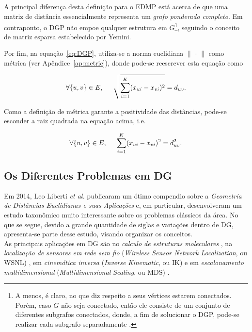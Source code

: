 \documentclass[a4paper,12pt]{article}
\begin{document}
A principal diferença desta definição para o EDMP está acerca de que uma matriz de distância essencialmente representa um \textit{grafo ponderado completo}. Em contraponto, o DGP não empoe qualquer estrutura em $G$\footnote{A menos, é claro, no que diz respeito a seus vértices estarem conectados. Porém, caso $G$ não seja conectado, então ele consiste de um conjunto de diferentes subgrafos conectados, donde, a fim de solucionar o DGP, pode-se realizar cada subgrafo separadamente \cite{libertiEDG}.}, seguindo o conceito de matriz esparsa estabelecido por Yemini.

Por fim, na equação~\ref{eq:DGP}, utiliza-se a norma euclidiana $\lVert$ $\cdot$ $\rVert$ como métrica (ver Apêndice~\ref{ap:metric}), donde pode-se reescrever esta equação como

\begin{equation*}
	\forall \{u,v\} \in E, \hspace{0.5cm} \sqrt{\sum_{i=1}^{K}(x_{ui} - x_{vi})^2} = d_{uv}.
\end{equation*}

Como a definição de métrica garante a positividade das distâncias, pode-se esconder a raiz quadrada na equação acima, i.e.

\begin{equation}
\forall \{u,v\} \in E, \hspace{0.5cm} \sum_{i=1}^{K}(x_{ui} - x_{vi})^2 = d_{uv}^2.
\label{eq:DGPSistemaQuadratico}
\end{equation}

\subsection{Os Diferentes Problemas em DG}

Em 2014, Leo Liberti \textit{et al.} publicaram um ótimo compendio sobre a \textit{Geometria de Distâncias Euclidianas e suas Aplicações} \cite{carlileGDandAplications} e, em particular, desenvolveram um estudo  taxonômico muito interessante sobre os problemas clássicos da área. No que se segue, devido a grande quantidade de siglas e variações dentro de DG, apresenta-se parte desse estudo, visando organizar os conceitos. 
\\

As principais aplicações em DG são no \textit{calculo de estruturas moleculares} \cite{crippen:DistancesAndMolecularConformation}, na \textit{localização de sensores em rede sem fio} (\textit{Wireless Sensor Network Localization}, ou WSNL) \cite{yemini1978positioning}, em \textit{cinemática inversa} (\textit{Inverse Kinematic}, ou IK) \cite{cinematicaInversa} e em \textit{escalonamento multidimensional} (\textit{Multidimensional Scaling}, ou MDS) \cite{multidimensionalScaling}.
\end{document}
